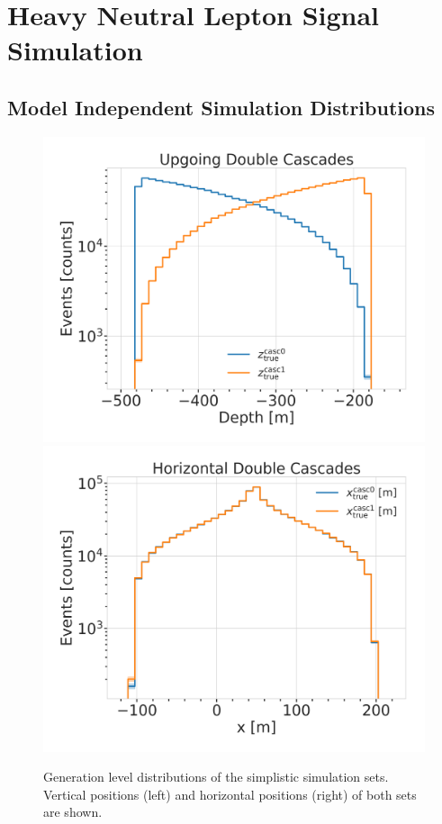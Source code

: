 
\chapter{Heavy Neutral Lepton Signal Simulation}


\section{Model Independent Simulation Distributions} 

\begin{figure}[h]
    \centering
    \includegraphics[width=0.49\linewidth]{figures/model_independent_simulation/gen_level/1_d_distr_depths_clipped.png}
    \includegraphics[width=0.49\linewidth]{figures/model_independent_simulation/gen_level/1_d_distr_xs_clipped.png}
    \caption[Simplified model independent simulation generation level distributions]{Generation level distributions of the simplistic simulation sets. Vertical positions (left) and horizontal positions (right) of both sets are shown.}
\end{figure}


